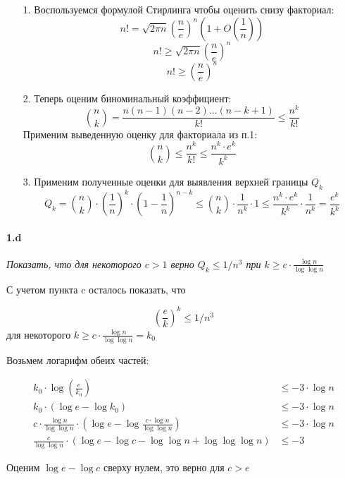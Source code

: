 \documentclass[russian]{article}
\begin{document}
\begin{enumerate}
\item[1.] Воспользуемся формулой Стирлинга чтобы оценить снизу факториал:
\[
n! = \sqrt{2 \pi n} \left( \frac{n}{e} \right)^n \left( 1 + O \left( \frac{1}{n} \right) \right)
\]
\[
n! \geqslant \sqrt{2 \pi n} \left( \frac{n}{e} \right)^n
\]
\[
n! \geqslant \left( \frac{n}{e} \right)^n
\]

\item[2.] Теперь оценим биноминальный коэффициент:
\[
{n \choose k} = \frac{n(n-1)(n-2)\ldots(n-k+1)}{k!} \leqslant \frac{n^k}{k!}
\]
Применим выведенную оценку для факториала из п.1:
\[
{n \choose k} \leqslant \frac{n^k}{k!} \leqslant \frac{n^k \cdot e^k}{k^k}
\]

\item[3.] Применим полученные оценки для выявления верхней границы $Q_k$
\[
Q_k = {n \choose k} \cdot \left(\frac{1}n\right)^{k} \cdot \left(1 - \frac{1}n\right)^{n-k} \leqslant
{n \choose k} \cdot \frac{1}{n^k} \cdot 1\leqslant
\frac{n^k \cdot e^k}{k^k} \cdot \frac{1}{n^k} = \frac{e^k}{k^k}
\]

\end{enumerate}

\paragraph*{1.d}

\textit{Показать, что для некоторого $c>1$ верно $Q_k \leqslant 1/n^3$ при $k \geqslant c \cdot \frac{\log n}{\log \log n}$}

С учетом пункта c осталось показать, что

\[
\left(\frac{e}{k}\right)^{k} \leqslant 1/n^3
\]
для некоторого $k \geqslant c \cdot \frac{\log n}{\log \log n} = k_0$

Возьмем логарифм обеих частей:

\begin{align*}
k_0 \cdot \log\left(\frac{e}{k_0}\right) &\leqslant -3 \cdot \log n \\
k_0 \cdot (\log e - \log k_0) &\leqslant -3 \cdot \log n \\
c \cdot \frac{\log n}{\log \log n} \cdot (\log e - \log \frac{c \cdot \log n}{\log \log n}) &\leqslant -3 \cdot \log n \\
\frac{c}{\log \log n} \cdot (\log e - \log c - \log \log n + \log \log \log n) &\leqslant -3
\end{align*}

Оценим $\log e - \log c$ сверху нулем, это верно для $c > e$
\end{document}
